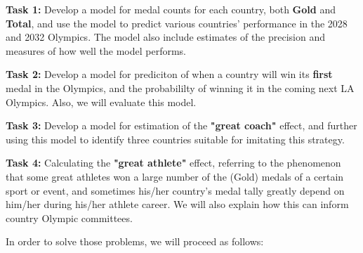 \textbf{Task 1:} Develop a model for medal counts for each country, both \textbf{Gold} and \textbf{Total}, and use the model to predict various countries' performance in the 2028 and 2032 Olympics. The model also include estimates of the precision and measures of how well the model performs.

\textbf{Task 2:} Develop a model for prediciton of when a country will win its \textbf{first} medal in the Olympics, and the probabililty of winning it in the coming next LA Olympics. Also, we will evaluate this model.

\textbf{Task 3:} Develop a model for estimation of the \textbf{"great coach"} effect, and further using this model to identify three countries suitable for imitating this strategy.

\textbf{Task 4:} Calculating the \textbf{"great athlete"} effect, referring to the phenomenon that some great athletes won a large number of the (Gold) medals of a certain sport or event, and sometimes his/her country's medal tally greatly depend on him/her during his/her athlete career. We will also explain how this can inform country Olympic committees.


In order to solve those problems, we will proceed as follows:

